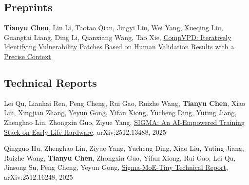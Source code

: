 \documentclass[letterpaper]{article}
\renewenvironment{itemize}{
  \begin{list}{}{
    \setlength{\leftmargin}{1.5em}
  }
}{
  \end{list}
}
\begin{document}
\subsection*{Preprints}
\begin{itemize}
    \item \textbf{Tianyu Chen}, Lin Li, Taotao Qian, Jingyi Liu, Wei Yang, Xueqing Liu, Guangtai Liang, Ding Li, Qianxiang Wang, Tao Xie, \href{https://arxiv.org/abs/2310.02530}{CompVPD: Iteratively Identifying Vulnerability Patches Based on Human Validation Results with a Precise Context}
\end{itemize}

\subsection*{Technical Reports}
\begin{itemize}
    \item Lei Qu, Lianhai Ren, Peng Cheng, Rui Gao, Ruizhe Wang, \textbf{Tianyu Chen}, Xiao Liu, Xingjian Zhang, Yeyun Gong, Yifan Xiong, Yucheng Ding, Yuting Jiang, Zhenghao Lin, Zhongxin Guo, Ziyue Yang, \href{https://arxiv.org/abs/2512.13488}{SIGMA: An AI-Empowered Training Stack on Early-Life Hardware}, arXiv:2512.13488, 2025
    \item Qingguo Hu, Zhenghao Lin, Ziyue Yang, Yucheng Ding, Xiao Liu, Yuting Jiang, Ruizhe Wang, \textbf{Tianyu Chen}, Zhongxin Guo, Yifan Xiong, Rui Gao, Lei Qu, Jinsong Su, Peng Cheng, Yeyun Gong, \href{https://arxiv.org/abs/2512.16248}{Sigma-MoE-Tiny Technical Report}, arXiv:2512.16248, 2025
\end{itemize}

\end{document}
